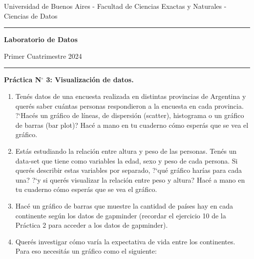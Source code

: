 \documentclass[a4paper,11pt]{article}
\theoremstyle{definition}
\begin{document}
\centerline{{\small Universidad de Buenos Aires - Facultad de Ciencias Exactas y Naturales - Ciencias de Datos}}

\vskip 0.2cm

\hrule

\vskip 0.2cm

 \centerline{{\bf\Large{\sc Laboratorio de Datos}}}

 \vskip 0.2cm

 \centerline{\ttfamily Primer Cuatrimestre 2024}

\vskip 0.2cm

 \hrule

 \bigskip
 \centerline{\bf Práctica N$^\circ$ 3: Visualizaci\'on de datos.}
 \bigskip



\begin{enumerate}[resume]
\item Ten\'es datos de una encuesta realizada en distintas provincias de Argentina y quer\'es saber cu\'antas personas respondieron a la encuesta en cada provincia. ?`Hac\'es un gr\'afico de l\'ineas, de dispersi\'on (scatter), histograma o un gr\'afico de barras (bar plot)? Hac\'e a mano en tu cuaderno c\'omo esper\'as que se vea el gr\'afico.

\item Est\'as estudiando la relaci\'on entre altura y peso de las personas. Ten\'es un data-set que tiene como variables la edad, sexo y peso de cada persona. Si quer\'es describir estas variables por separado, ?`qu\'e gr\'afico har\'ias para cada una? ?`y si quer\'es visualizar la relaci\'on entre peso y altura? Hac\'e a mano en tu cuaderno c\'omo esper\'as que se vea el gr\'afico.

\item Hac\'e un gr\'afico de barras que muestre la cantidad de pa\'ises hay en cada continente seg\'un los datos de gapminder (recordar el ejercicio 10 de la Práctica 2 para acceder a los datos de gapminder).

\item Quer\'es investigar c\'omo var\'ia la expectativa de vida entre los continentes. Para eso necesit\'as un gr\'afico como el siguiente:


\end{enumerate}
\end{document}
